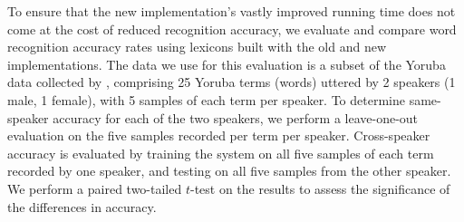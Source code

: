 \documentclass[11pt]{article}
\begin{document}
To ensure that the new implementation's vastly improved running time does not come at the cost of reduced recognition accuracy, we evaluate and compare word recognition accuracy rates using lexicons built with the old and new implementations. The data we use for this evaluation is a subset of the Yoruba data collected by , comprising 25 Yoruba terms (words) uttered by 2 speakers (1 male, 1 female), with 5 samples of each term per speaker. 
To determine same-speaker accuracy for each of the two speakers, we perform a leave-one-out evaluation on the five samples recorded per term per speaker. 
Cross-speaker accuracy is evaluated by training the system on all five samples of each term recorded by one speaker, and testing on all five samples from the other speaker.
We perform a paired two-tailed $t$-test on the results to assess the significance of the differences in accuracy.
\end{document}
